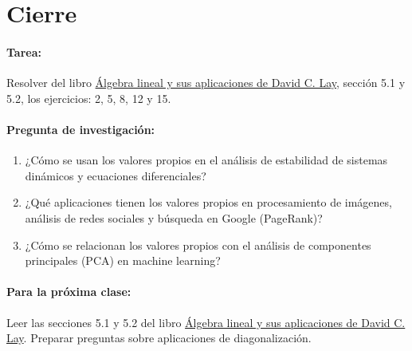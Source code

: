 \documentclass[a4,11pt]{aleph-notas}
\begin{document}
\section*{Cierre}  

\paragraph{Tarea:}  
Resolver del libro \href{https://catalogobiblioteca.puce.edu.ec/cgi-bin/koha/opac-detail.pl?biblionumber=86083&query_desc=kw%2Cwrdl%3A%20%C3%81lgebra%20lineal%20y%20sus%20aplicaciones}{Álgebra lineal y sus aplicaciones de David C. Lay}, sección 5.1 y 5.2, los ejercicios: 2, 5, 8, 12 y 15.

\paragraph{Pregunta de investigación:}  
\begin{enumerate}[leftmargin=*]  
    \item ¿Cómo se usan los valores propios en el análisis de estabilidad de sistemas dinámicos y ecuaciones diferenciales?
    \item ¿Qué aplicaciones tienen los valores propios en procesamiento de imágenes, análisis de redes sociales y búsqueda en Google (PageRank)?
    \item ¿Cómo se relacionan los valores propios con el análisis de componentes principales (PCA) en machine learning?
\end{enumerate}  

\paragraph{Para la próxima clase:}  
Leer las secciones 5.1 y 5.2 del libro \href{https://catalogobiblioteca.puce.edu.ec/cgi-bin/koha/opac-detail.pl?biblionumber=86083&query_desc=kw%2Cwrdl%3A%20%C3%81lgebra%20lineal%20y%20sus%20aplicaciones}{Álgebra lineal y sus aplicaciones de David C. Lay}. Preparar preguntas sobre aplicaciones de diagonalización.
\end{document}
